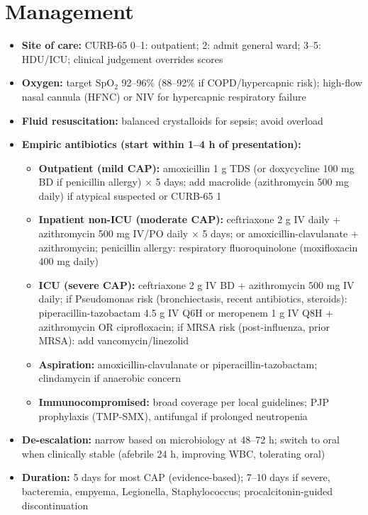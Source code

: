 \section*{Management}
\begin{itemize}
    \item \textbf{Site of care:} CURB-65 0--1: outpatient; 2: admit general ward; 3--5: HDU/ICU; clinical judgement overrides scores
    \item \textbf{Oxygen:} target SpO$_2$ 92--96\% (88--92\% if COPD/hypercapnic risk); high-flow nasal cannula (HFNC) or NIV for hypercapnic respiratory failure
    \item \textbf{Fluid resuscitation:} balanced crystalloids for sepsis; avoid overload
    \item \textbf{Empiric antibiotics (start within 1--4 h of presentation):}
    \begin{itemize}
        \item \textbf{Outpatient (mild CAP):} amoxicillin 1 g TDS (or doxycycline 100 mg BD if penicillin allergy) $\times$ 5 days; add macrolide (azithromycin 500 mg daily) if atypical suspected or CURB-65 1
        \item \textbf{Inpatient non-ICU (moderate CAP):} ceftriaxone 2 g IV daily + azithromycin 500 mg IV/PO daily $\times$ 5 days; or amoxicillin-clavulanate + azithromycin; penicillin allergy: respiratory fluoroquinolone (moxifloxacin 400 mg daily)
        \item \textbf{ICU (severe CAP):} ceftriaxone 2 g IV BD + azithromycin 500 mg IV daily; if Pseudomonas risk (bronchiectasis, recent antibiotics, steroids): piperacillin-tazobactam 4.5 g IV Q6H or meropenem 1 g IV Q8H + azithromycin OR ciprofloxacin; if MRSA risk (post-influenza, prior MRSA): add vancomycin/linezolid
        \item \textbf{Aspiration:} amoxicillin-clavulanate or piperacillin-tazobactam; clindamycin if anaerobic concern
        \item \textbf{Immunocompromised:} broad coverage per local guidelines; PJP prophylaxis (TMP-SMX), antifungal if prolonged neutropenia
    \end{itemize}
    \item \textbf{De-escalation:} narrow based on microbiology at 48--72 h; switch to oral when clinically stable (afebrile 24 h, improving WBC, tolerating oral)
    \item \textbf{Duration:} 5 days for most CAP (evidence-based); 7--10 days if severe, bacteremia, empyema, Legionella, Staphylococcus; procalcitonin-guided discontinuation

\end{itemize}
